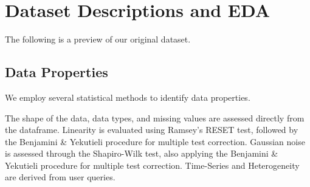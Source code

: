 \documentclass{article}
\begin{document}
\section{Dataset Descriptions and EDA}
The following is a preview of our original dataset.

\begin{table}[H]
    \centering
    \caption{Dataset Preview}
    
                
\end{table}

\subsection{Data Properties}
We employ several statistical methods to identify data properties.

The shape of the data, data types, and missing values are assessed directly from the dataframe.
Linearity is evaluated using Ramsey’s RESET test, followed by the Benjamini \& Yekutieli procedure for multiple test correction.
Gaussian noise is assessed through the Shapiro-Wilk test, also applying the Benjamini \& Yekutieli procedure for multiple test correction.
Time-Series and Heterogeneity are derived from user queries.
\end{document}
